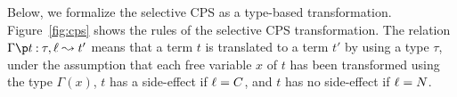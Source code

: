 
Below, we formalize the selective CPS as a type-based transformation.
Figure~\ref{fig:cps} shows the rules of the selective CPS
transformation.  The relation $\CPS{\Gamma}{t}{\tau}{\ell}{t'}$ means
that a term $t$ is translated to a term $t'$ by using a type $\tau$,
under the assumption that each free variable $x$ of $t$ has been
transformed using the type $\Gamma(x)$, $t$ has a side-effect if
$\ell=C$, and $t$ has no side-effect if $\ell=N$.


